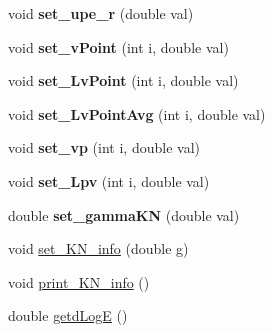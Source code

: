 \begin{DoxyCompactItemize}
\item 
\hypertarget{classenergyDissProc_a6b51c71d65457f34d351ec7299fbe732}{void {\bfseries set\-\_\-upe\-\_\-r} (double val)}\label{classenergyDissProc_a6b51c71d65457f34d351ec7299fbe732}

\item 
\hypertarget{classenergyDissProc_a46137d70a318966b6517432c10afc8d3}{void {\bfseries set\-\_\-v\-Point} (int i, double val)}\label{classenergyDissProc_a46137d70a318966b6517432c10afc8d3}

\item 
\hypertarget{classenergyDissProc_ace0f100af6f7034f5c3487f0cd6b9fd7}{void {\bfseries set\-\_\-\-Lv\-Point} (int i, double val)}\label{classenergyDissProc_ace0f100af6f7034f5c3487f0cd6b9fd7}

\item 
\hypertarget{classenergyDissProc_ae43c41e227b73a5205d9df5de1ede0d0}{void {\bfseries set\-\_\-\-Lv\-Point\-Avg} (int i, double val)}\label{classenergyDissProc_ae43c41e227b73a5205d9df5de1ede0d0}

\item 
\hypertarget{classenergyDissProc_a6a472066039c6a121e90010e66ac7535}{void {\bfseries set\-\_\-vp} (int i, double val)}\label{classenergyDissProc_a6a472066039c6a121e90010e66ac7535}

\item 
\hypertarget{classenergyDissProc_a59519f29627dcf510e7e268d138f2c53}{void {\bfseries set\-\_\-\-Lpv} (int i, double val)}\label{classenergyDissProc_a59519f29627dcf510e7e268d138f2c53}

\item 
\hypertarget{classenergyDissProc_a2d1d8edc34f87b276820c38e3c0dbd72}{double {\bfseries set\-\_\-gamma\-K\-N} (double val)}\label{classenergyDissProc_a2d1d8edc34f87b276820c38e3c0dbd72}

\item 
void \hyperlink{classenergyDissProc_a69ea4be814273e47e69e31e593c3a250}{set\-\_\-\-K\-N\-\_\-info} (double g)
\item 
void \hyperlink{classenergyDissProc_addd5bd336327bc4031644699cca16298}{print\-\_\-\-K\-N\-\_\-info} ()
\item 
double \hyperlink{classenergyDissProc_a5ef88d9ecacade52bbd277695230d237}{getd\-Log\-E} ()
\end{DoxyCompactItemize}
